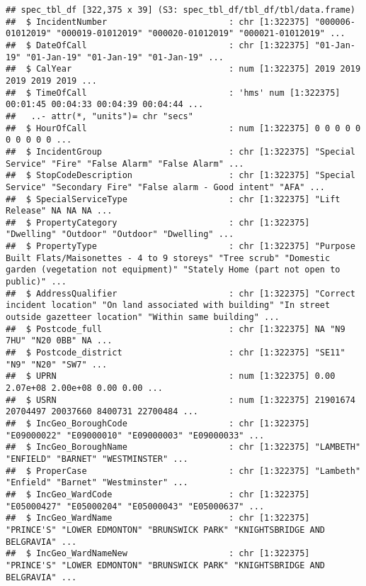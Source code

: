 \documentclass[
]{article}
\begin{document}
\begin{verbatim}
## spec_tbl_df [322,375 x 39] (S3: spec_tbl_df/tbl_df/tbl/data.frame)
##  $ IncidentNumber                        : chr [1:322375] "000006-01012019" "000019-01012019" "000020-01012019" "000021-01012019" ...
##  $ DateOfCall                            : chr [1:322375] "01-Jan-19" "01-Jan-19" "01-Jan-19" "01-Jan-19" ...
##  $ CalYear                               : num [1:322375] 2019 2019 2019 2019 2019 ...
##  $ TimeOfCall                            : 'hms' num [1:322375] 00:01:45 00:04:33 00:04:39 00:04:44 ...
##   ..- attr(*, "units")= chr "secs"
##  $ HourOfCall                            : num [1:322375] 0 0 0 0 0 0 0 0 0 0 ...
##  $ IncidentGroup                         : chr [1:322375] "Special Service" "Fire" "False Alarm" "False Alarm" ...
##  $ StopCodeDescription                   : chr [1:322375] "Special Service" "Secondary Fire" "False alarm - Good intent" "AFA" ...
##  $ SpecialServiceType                    : chr [1:322375] "Lift Release" NA NA NA ...
##  $ PropertyCategory                      : chr [1:322375] "Dwelling" "Outdoor" "Outdoor" "Dwelling" ...
##  $ PropertyType                          : chr [1:322375] "Purpose Built Flats/Maisonettes - 4 to 9 storeys" "Tree scrub" "Domestic garden (vegetation not equipment)" "Stately Home (part not open to public)" ...
##  $ AddressQualifier                      : chr [1:322375] "Correct incident location" "On land associated with building" "In street outside gazetteer location" "Within same building" ...
##  $ Postcode_full                         : chr [1:322375] NA "N9 7HU" "N20 0BB" NA ...
##  $ Postcode_district                     : chr [1:322375] "SE11" "N9" "N20" "SW7" ...
##  $ UPRN                                  : num [1:322375] 0.00 2.07e+08 2.00e+08 0.00 0.00 ...
##  $ USRN                                  : num [1:322375] 21901674 20704497 20037660 8400731 22700484 ...
##  $ IncGeo_BoroughCode                    : chr [1:322375] "E09000022" "E09000010" "E09000003" "E09000033" ...
##  $ IncGeo_BoroughName                    : chr [1:322375] "LAMBETH" "ENFIELD" "BARNET" "WESTMINSTER" ...
##  $ ProperCase                            : chr [1:322375] "Lambeth" "Enfield" "Barnet" "Westminster" ...
##  $ IncGeo_WardCode                       : chr [1:322375] "E05000427" "E05000204" "E05000043" "E05000637" ...
##  $ IncGeo_WardName                       : chr [1:322375] "PRINCE'S" "LOWER EDMONTON" "BRUNSWICK PARK" "KNIGHTSBRIDGE AND BELGRAVIA" ...
##  $ IncGeo_WardNameNew                    : chr [1:322375] "PRINCE'S" "LOWER EDMONTON" "BRUNSWICK PARK" "KNIGHTSBRIDGE AND BELGRAVIA" ...

\end{verbatim}
\end{document}
